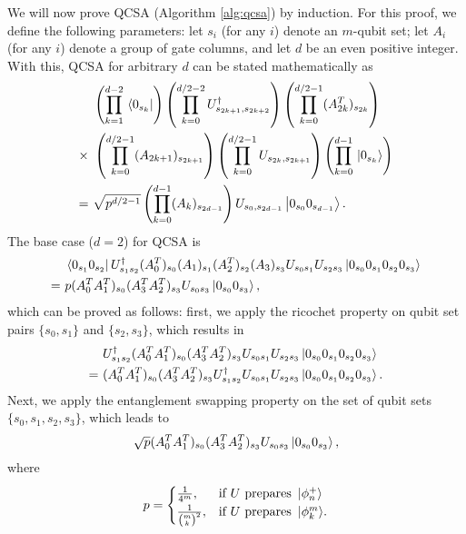 \documentclass[Dual]{msu-thesis}
\begin{document}
We will now prove QCSA (Algorithm \ref{alg:qcsa}) by induction. For this proof, we define the following parameters: let $s_i$ (for any $i$) denote an $m$-qubit set; let $A_i$ (for any $i$) denote a group of gate columns, and let $d$ be an even positive integer. With this, QCSA for arbitrary $d$ can be stated mathematically as
\begin{align}
\label{qcsa_statement}
&
\left(\prod_{k=1}^{d-2}\bra*{0_{s_k}}\right)
\left(\prod_{k=0}^{d/2-2}U^\dagger_{s_{2k+1},s_{2k+2}}\right)
\left(\prod_{k=0}^{d/2-1}(A^T_{2k})_{s_{2k}}\right)
\nonumber
\\
\times \ &
\left(\prod_{k=0}^{d/2-1}(A_{2k+1})_{s_{2k+1}}\right)
\left(\prod_{k=0}^{d/2-1}U_{s_{2k},s_{2k+1}}\right)
\left(\prod_{k=0}^{d-1}\ket*{0_{s_k}}\right)
\nonumber
\\
= \ &
\sqrt{p^{d/2-1}}\left(\prod_{k=0}^{d-1}(A_k)_{s_{2d-1}}\right)U_{s_{0},s_{2d-1}}\ket{0_{s_0}0_{s_{d-1}}}.
\end{align}
The base case ($d=2$) for QCSA is
\begin{align}
& \bra{0_{s_1}0_{s_2}}U^\dagger_{s_1s_2}(A^T_0)_{s_0}(A_1)_{s_1}(A^T_2)_{s_2}(A_3)_{s_3}U_{s_0s_1}U_{s_2s_3}\ket{0_{s_0}0_{s_1}0_{s_2}0_{s_3}}
\\
=\ &
p(A^T_0A^T_1)_{s_0}(A^T_3A^T_2)_{s_3}U_{s_0s_3}\ket{0_{s_0}0_{s_3}},
\end{align}
which can be proved as follows: first, we apply the ricochet property on qubit set pairs $\{s_0,s_1\}$ and $\{s_2,s_3\}$, which results in
\begin{align}
& U^\dagger_{s_1s_2}(A^T_0A^T_1)_{s_0}(A^T_3A^T_2)_{s_3}U_{s_0s_1}U_{s_2s_3}\ket{0_{s_0}0_{s_1}0_{s_2}0_{s_3}}
\\
=\ & (A^T_0A^T_1)_{s_0}(A^T_3A^T_2)_{s_3}U^\dagger_{s_1s_2}U_{s_0s_1}U_{s_2s_3}\ket{0_{s_0}0_{s_1}0_{s_2}0_{s_3}}.
\end{align}
Next, we apply the entanglement swapping property on the set of qubit sets $\{s_0,s_1,s_2,s_3\}$, which leads to
\begin{align}
\sqrt{p}(A^T_0A^T_1)_{s_0}(A^T_3A^T_2)_{s_3}U_{s_0s_3}\ket{0_{s_0}0_{s_3}},
\end{align}
where 
\begin{align}
p =
\begin{cases}
\frac{1}{4^m}, & \text{if $U$ prepares $\ket*{\phi^+_n}$} \\
\frac{1}{{m \choose k}^2}, & \text{if $U$ prepares $\ket*{\phi^m_k}$}.
\end{cases}
\end{align}
\end{document}

